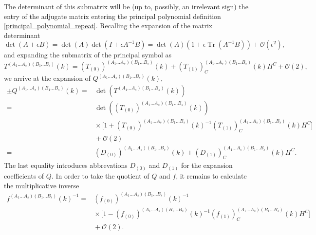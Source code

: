 The determinant of this submatrix will be (up to, possibly, an irrelevant sign) the entry of the adjugate matrix entering the principal polynomial definition \eqref{principal_polynomial_repeat}. Recalling the expansion of the matrix determinant
\begin{equation}
  \operatorname{det}(A + \epsilon B) = \operatorname{det}(A) \operatorname{det}(I + \epsilon A^{-1} B) = \operatorname{det}(A) (1 + \epsilon \operatorname{Tr}(A^{-1} B)) + \mathcal O(\epsilon^2),
\end{equation}
and expanding the submatrix of the principal symbol as
\begin{equation}
  T^{(A_1\dots A_s)(B_1\dots B_s)}(k) = (T_{(0)})^{(A_1\dots A_s)(B_1\dots B_s)}(k) + (T_{(1)})^{(A_1\dots A_s)(B_1\dots B_s)}_C(k)H^C + \mathcal O(2),
\end{equation}
we arrive at the expansion of $Q^{(A_1\dots A_s)(B_1\dots B_s)}(k)$,
\begin{equation}\label{expansion_minor}
  \begin{aligned}
    \pm Q^{(A_1\dots A_s)(B_1\dots B_s)}(k)     = &{} \operatorname{det}(T^{(A_1\dots A_s)(B_1\dots B_s)}(k)) \\
                                            = &{} \operatorname{det}((T_{(0)})^{(A_1\dots A_s)(B_1\dots B_s)}(k)) \\
                                            &{} \times \lbrack 1 + (T_{(0)})^{(A_1\dots A_s)(B_1\dots B_s)}(k)^{-1}(T_{(1)})^{(A_1\dots A_s)(B_1\dots B_s)}_C(k)H^C\rbrack \\
                                            &{} + \mathcal O(2) \\
                                            = &{} (D_{(0)})^{(A_1\dots A_s)(B_1\dots B_s)}(k) + (D_{(1)})^{(A_1\dots A_s)(B_1\dots B_s)}_C(k) H^C.
    \end{aligned}
\end{equation}
The last equality introduces abbrevations $D_{(0)}$ and $D_{(1)}$ for the expansion coefficients of $Q$. In order to take the quotient of $Q$ and $f$, it remains to calculate the multiplicative inverse 
\begin{equation}
  \begin{aligned}
    f^{(A_1\dots A_s)(B_1\dots B_s)}(k)^{-1} = &{} (f_{(0)})^{(A_1\dots A_s)(B_1\dots B_s)}(k)^{-1} \\
                                               &{} \times \lbrack 1 - (f_{(0)})^{(A_1\dots A_s)(B_1\dots B_s)}(k)^{-1}(f_{(1)})^{(A_1\dots A_s)(B_1\dots B_s)}_C(k)H^C \rbrack \\
                                               &{} + \mathcal O(2).
  \end{aligned}
\end{equation}
